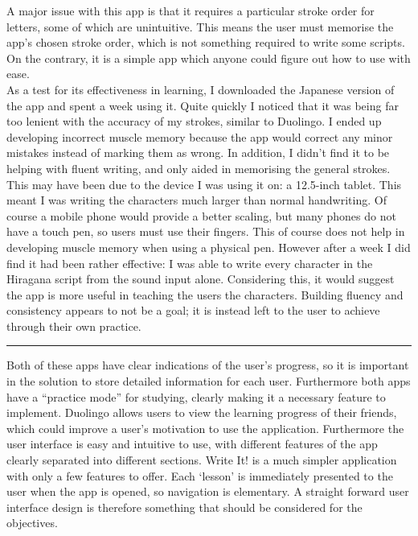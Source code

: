 \documentclass{article}
\begin{document}
A major issue with this app is that it requires a particular stroke order for letters, some of which are unintuitive. This means the user must memorise the app's chosen stroke order, which is not something required to write some scripts. On the contrary, it is a simple app which anyone could figure out how to use with ease. \\

As a test for its effectiveness in learning, I downloaded the Japanese version of the app and spent a week using it. Quite quickly I noticed that it was being far too lenient with the accuracy of my strokes, similar to Duolingo. I ended up developing incorrect muscle memory because the app would correct any minor mistakes instead of marking them as wrong. In addition, I didn't find it to be helping with fluent writing, and only aided in memorising the general strokes. This may have been due to the device I was using it on: a 12.5-inch tablet. This meant I was writing the characters much larger than normal handwriting. Of course a mobile phone would provide a better scaling, but many phones do not have a touch pen, so users must use their fingers. This of course does not help in developing muscle memory when using a physical pen. However after a week I did find it had been rather effective: I was able to write every character in the Hiragana script from the sound input alone. Considering this, it would suggest the app is more useful in teaching the users the characters. Building fluency and consistency appears to not be a goal; it is instead left to the user to achieve through their own practice.

\begin{center}
\rule{0.5\linewidth}{0.4pt}
\end{center}

Both of these apps have clear indications of the user's progress, so it is important in the solution to store detailed information for each user. Furthermore both apps have a “practice mode” for studying, clearly making it a necessary feature to implement. Duolingo allows users to view the learning progress of their friends, which could improve a user's motivation to use the application. Furthermore the user interface is easy and intuitive to use, with different features of the app clearly separated into different sections. Write It! is a much simpler application with only a few features to offer. Each `lesson' is immediately presented to the user when the app is opened, so navigation is elementary. A straight forward user interface design is therefore something that should be considered for the objectives. \\
\end{document}
